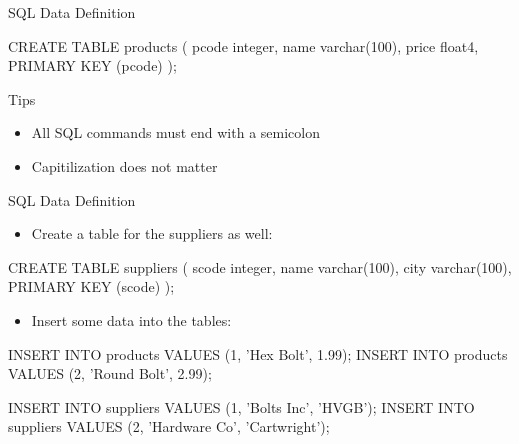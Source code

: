 \documentclass[ignorenonframetext,xcolor=x11names]{beamer}
\begin{document}
\begin{frame}[label=full,fragile]{SQL Data Definition}
\begin{sqlcode}
CREATE TABLE products (
  pcode integer,
  name  varchar(100),
  price float4,
  PRIMARY KEY (pcode) );
\end{sqlcode}
\normalsize
\vspace{-5mm}
\begin{block}{Tips}
\begin{itemize}
  \item All SQL commands must end with a semicolon
  \item Capitilization does not matter
\end{itemize}
\end{block}
\end{frame}

\begin{frame}[label=full,fragile]{SQL Data Definition}
\begin{itemize}
  \item Create a table for the suppliers as well:
\end{itemize}
\footnotesize
\begin{sqlcode}
CREATE TABLE suppliers (
  scode integer,
  name  varchar(100),
  city  varchar(100),
  PRIMARY KEY (scode) );
\end{sqlcode}
\normalsize
\begin{itemize}
  \item Insert some data into the tables:
\end{itemize}
\footnotesize
\begin{sqlcode}
INSERT INTO products VALUES (1, 'Hex Bolt', 1.99);
INSERT INTO products VALUES (2, 'Round Bolt', 2.99);

INSERT INTO suppliers VALUES (1, 'Bolts Inc', 'HVGB');
INSERT INTO suppliers 
    VALUES (2, 'Hardware Co', 'Cartwright');
\end{sqlcode}
\vspace{5mm}
\end{frame}
\end{document}
